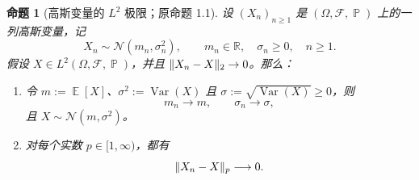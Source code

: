 \documentclass[UTF8,11pt,a4paper,oneside,fontset=fandol]{ctexrep}
\numberwithin{equation}{section}
\theoremstyle{plain}
\newtheorem{proposition}[theorem]{命题}
\theoremstyle{definition}
\theoremstyle{remark}
\newcommand{\R}{\mathbb{R}}
\newcommand{\F}{\mathcal{F}}
\DeclareMathOperator{\Prob}{\mathbb{P}}
\DeclareMathOperator{\E}{\mathbb{E}}
\DeclareMathOperator{\Var}{Var}
\DeclarePairedDelimiter{\norm}{\lVert}{\rVert}
\begin{document}
\begin{samepage}
\begin{proposition}[高斯变量的 $L^2$ 极限；原命题 1.1]
\label{prop:gaussian-l2-limit}
设 $(X_n)_{n\ge1}$ 是 $(\Omega,\F,\Prob)$ 上的一列高斯变量，记
\[
  X_n\sim\mathcal{N}(m_n,\sigma_n^2),
  \qquad m_n\in\R,\quad \sigma_n\ge0,\quad n\ge1.
\]
假设 $X\in L^2(\Omega,\F,\Prob)$，并且
$\norm{X_n-X}_2\to0$。那么：
\begin{enumerate}[label=(\arabic*),leftmargin=2.6em]
  \item 令 $m:=\E[X]$、$\sigma^2:=\Var(X)$ 且
  $\sigma:=\sqrt{\Var(X)}\ge0$，则
  \[
    m_n\longrightarrow m,\qquad
    \sigma_n\longrightarrow\sigma,
  \]
  且 $X\sim\mathcal{N}(m,\sigma^2)$。

  \item 对每个实数 $p\in[1,\infty)$，都有
  \[
    \norm{X_n-X}_p\longrightarrow0.
  \]
\end{enumerate}
\end{proposition}
\end{samepage}
\end{document}
